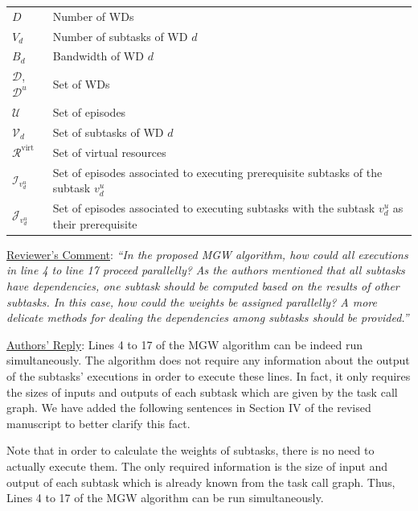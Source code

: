 \documentclass[12pt,draftclsnofoot,onecolumn]{IEEEtran}
\newcommand{\rev}[1]{{\color{blue}#1}} %
\newcommand{\rev}[1]{#1}
\newenvironment{my}[2]%
{\begin{list}{}%
{\setlength{\rightmargin}{#1}\setlength{\leftmargin}{#2}}%


 \item[]{}

} {\end{list}}
\begin{document}
\begin{enumerate}
\begin{my}{1cm}{1cm}
{\begin{table}[h]
{\begin{tabular}{ |p{2cm}|p{12cm}|  }
				$D$ & Number of WDs \\
				$V_d$ & Number of subtasks of WD $d$ \\
				$B_d$ & Bandwidth of WD $d$ \\
				$\mathcal{D}$, $\mathcal{D}^u$ & Set of WDs \\ 
				$\mathcal{U}$ & Set of episodes \\
				$\mathcal{V}_d$ & Set of subtasks of WD $d$ \\
				$\mathcal{R}^{\text{virt}}$ & Set of virtual resources \\
				$\mathcal{I}_{v_d^u}$ & Set of episodes associated to executing prerequisite subtasks of the subtask $v_d^u$ \\
				$\mathcal{J}_{v_d^u}$ & Set of episodes associated to executing subtasks with the subtask $v_d^u$ as their prerequisite \\
				\hline
			\end{tabular}}
	\end{table}}
\end{my}

\item \underline{Reviewer's Comment}: \textit {``In the proposed MGW algorithm, how could all executions in line 4 to line 17 proceed parallelly? As the authors mentioned that all subtasks have dependencies, one subtask should be computed based on the results of other subtasks. In this case, how could the weights be assigned parallelly? A more delicate methods for dealing the dependencies among subtasks should be provided.''} \newline

\underline{Authors' Reply}: Lines 4 to 17 of the MGW algorithm can be indeed run simultaneously. The algorithm does not require any information about the output of the subtasks' executions in order to execute these lines. In fact, it only requires the sizes of inputs and outputs of each subtask which are given by the task call graph. We have added the following sentences in Section IV of the revised manuscript to better clarify this fact.\\

\begin{my}{1cm}{1cm}
	\rev{Note that in order to calculate the weights of subtasks, there is no need to actually execute them. The only required information is the size of input and output of each subtask which is already known from the task call graph. Thus, Lines 4 to 17 of the MGW algorithm can be run simultaneously.\newline}
\end{my}


\end{enumerate}
\end{document}
